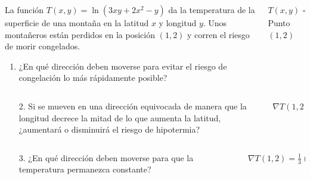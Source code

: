\documentclass[aspectratio=169,10pt,t]{beamer}
\begin{document}
\begin{frame}
\begin{columns}
\begin{column}[T]{0.7\textwidth}
La función $T(x,y)=\ln(3xy+2x^2-y)$ da la temperatura de la superficie de una montaña en la latitud $x$ y longitud $y$. Unos montañeros están perdidos en la posición $(1,2)$ y corren el riesgo de morir congelados.

\begin{enumerate}
\item ¿En qué dirección deben moverse para evitar el riesgo de congelación lo más rápidamente posible?
\end{enumerate}
\end{column}
\quad
\begin{column}[T]{0.3\textwidth}
\begin{datos}
$T(x,y)=\ln(3xy+2x^2-y)$ \\
Punto $(1,2)$\\
\end{datos}
\end{column}
\end{columns}
\end{frame}


\begin{frame}
\begin{columns}
\begin{column}[T]{0.75\textwidth}
\begin{enumerate}
\item[2.] Si se mueven en una dirección equivocada de manera que la longitud decrece la mitad de lo que aumenta la latitud, ¿aumentará o disminuirá el riesgo de hipotermia?
\end{enumerate}
\end{column}
\begin{column}[T]{0.25\textwidth}
\begin{datos}
$\nabla T(1,2) = \frac{1}{3}(5,1)$
\end{datos}
\end{column}
\end{columns}
\end{frame}

\begin{frame}
\begin{columns}
\begin{column}[T]{0.75\textwidth}
\begin{enumerate}
\item[3.] ¿En qué dirección deben moverse para que la temperatura permanezca constante?
\end{enumerate}
\end{column}
\begin{column}[T]{0.25\textwidth}
\begin{datos}
$\nabla T(1,2) = \frac{1}{3}(5,1)$
\end{datos}
\end{column}
\end{columns}
\end{frame}
\end{document}
